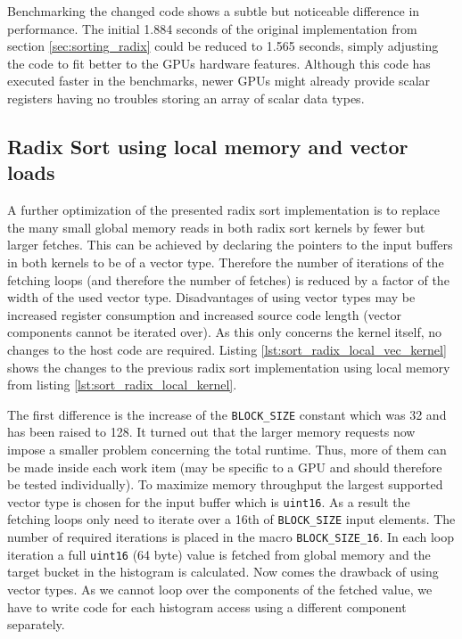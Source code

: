 Benchmarking the changed code shows a subtle but noticeable difference in performance. The initial 1.884 seconds of the original implementation from section \ref{sec:sorting_radix} could be reduced to 1.565 seconds, simply adjusting the code to fit better to the GPUs hardware features. Although this code has executed faster in the benchmarks, newer GPUs might already provide scalar registers having no troubles storing an array of scalar data types.

\subsection{Radix Sort using local memory and vector loads}
\label{sec:sorting_radix_local_vec}

A further optimization of the presented radix sort implementation is to replace the many small global memory reads in both radix sort kernels by fewer but larger fetches. This can be achieved by declaring the pointers to the input buffers in both kernels to be of a vector type. Therefore the number of iterations of the fetching loops (and therefore the number of fetches) is reduced by a factor of the width of the used vector type. Disadvantages of using vector types may be increased register consumption and increased source code length (vector components cannot be iterated over).
As this only concerns the kernel itself, no changes to the host code are required. Listing \ref{lst:sort_radix_local_vec_kernel} shows the changes to the previous radix sort implementation using local memory from listing \ref{lst:sort_radix_local_kernel}.



The first difference is the increase of the \lstinline!BLOCK_SIZE! constant which was 32 and has been raised to 128. It turned out that the larger memory requests now impose a smaller problem concerning the total runtime. Thus, more of them can be made inside each work item (may be specific to a GPU and should therefore be tested individually). To maximize memory throughput the largest supported vector type is chosen for the input buffer which is \lstinline!uint16!. As a result the fetching loops only need to iterate over a 16th of \lstinline!BLOCK_SIZE! input elements. The number of required iterations is placed in the macro \lstinline!BLOCK_SIZE_16!. In each loop iteration a full \lstinline!uint16! (64 byte) value is fetched from global memory and the target bucket in the histogram is calculated. Now comes the drawback of using vector types. As we cannot loop over the components of the fetched value, we have to write code for each histogram access using a different component separately.

